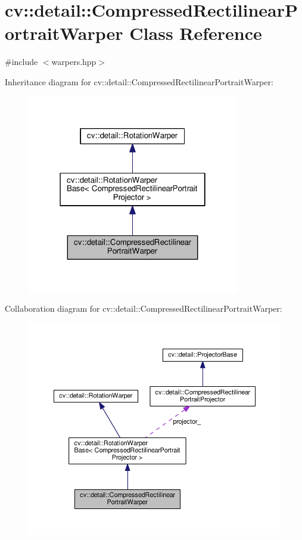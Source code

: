 \hypertarget{classcv_1_1detail_1_1CompressedRectilinearPortraitWarper}{\section{cv\-:\-:detail\-:\-:Compressed\-Rectilinear\-Portrait\-Warper Class Reference}
\label{classcv_1_1detail_1_1CompressedRectilinearPortraitWarper}
}


{\ttfamily \#include $<$warpers.\-hpp$>$}



Inheritance diagram for cv\-:\-:detail\-:\-:Compressed\-Rectilinear\-Portrait\-Warper\-:\nopagebreak
\begin{figure}[H]
\begin{center}
\leavevmode
\includegraphics[width=262pt]{classcv_1_1detail_1_1CompressedRectilinearPortraitWarper__inherit__graph}
\end{center}
\end{figure}


Collaboration diagram for cv\-:\-:detail\-:\-:Compressed\-Rectilinear\-Portrait\-Warper\-:\nopagebreak
\begin{figure}[H]
\begin{center}
\leavevmode
\includegraphics[width=350pt]{classcv_1_1detail_1_1CompressedRectilinearPortraitWarper__coll__graph}
\end{center}
\end{figure}
